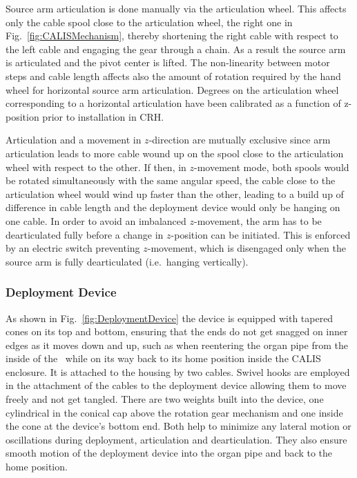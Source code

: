 Source arm articulation is done manually via the articulation wheel. This affects only the cable spool close to the articulation wheel, the right one in Fig.~\ref{fig:CALISMechanism}, thereby shortening the right cable with respect to the left cable and engaging the gear through a chain. As a result the source arm is articulated and the pivot center is lifted. The non-linearity between motor steps and cable length affects also the amount of rotation required by the hand wheel for horizontal source arm articulation. Degrees on the articulation wheel corresponding to a horizontal articulation have been calibrated as a function of z-position prior to installation in CRH.

Articulation and a movement in $z$-direction are mutually exclusive since arm articulation leads to more cable wound up on the spool close to the articulation wheel with respect to the other. If then, in $z$-movement mode, both spools would be rotated simultaneously with the same angular speed, the cable close to the articulation wheel would wind up faster than the other, leading to a build up of difference in cable length and the deployment device would only be hanging on one cable. In order to avoid an imbalanced $z$-movement, the arm has to be dearticulated fully before a change in $z$-position can be initiated. This is enforced by an electric switch preventing $z$-movement, which is disengaged only when the source arm is fully dearticulated (i.e.~hanging vertically). 

\subsubsection*{Deployment Device}
As shown in Fig.~\ref{fig:DeploymentDevice} the device is equipped with tapered cones on its top and bottom, ensuring that the ends do not get snagged on inner edges as it moves down and up, such as when reentering the organ pipe from the inside of the \lsv\ while on its way back to its home position inside the CALIS enclosure. It is attached to the housing by two cables. Swivel hooks are employed in the attachment of the cables to the deployment device allowing them to move freely and not get tangled. 
There are two weights built into the device, one cylindrical in the conical cap above the rotation gear mechanism and one inside the cone at the device's bottom end. Both help to minimize any lateral motion or oscillations during deployment, articulation and dearticulation. They also ensure smooth motion of the deployment device into the organ pipe and back to the home position.

